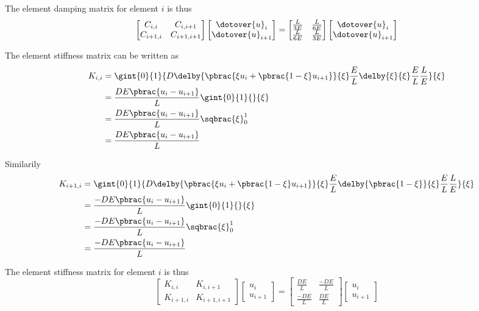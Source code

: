 The element damping matrix for element $i$ is thus
\begin{equation}
  \begin{bmatrix}
    C_{i,i} & C_{i,i+1} \\
    C_{i+1,i} & C_{i+1,i+1}
  \end{bmatrix}\begin{bmatrix}
    \dotover{u}_{i} \\
    \dotover{u}_{i+1}
  \end{bmatrix} = \begin{bmatrix}
    \frac{L}{3E} & \frac{L}{6E} \\
    \frac{L}{6E} & \frac{L}{3E}
   \end{bmatrix}\begin{bmatrix}
    \dotover{u}_{i} \\
    \dotover{u}_{i+1}
  \end{bmatrix}
\end{equation}


The element stiffness matrix can be written as
\begin{align}
  K_{i,i}&=\gint{0}{1}{D\delby{\pbrac{\xi u_{i}+\pbrac{1-\xi}u_{i+1}}}{\xi}\dfrac{E}{L}\delby{\xi}{\xi}\dfrac{E}{L}\dfrac{L}{E}}{\xi} \\
  &=\dfrac{DE\pbrac{u_{i}-u_{i+1}}}{L}\gint{0}{1}{}{\xi}\\
  &=\dfrac{DE\pbrac{u_{i}-u_{i+1}}}{L}\sqbrac{\xi}_{0}^{1}\\
  &=\dfrac{DE\pbrac{u_{i}-u_{i+1}}}{L}
\end{align}

Similarily
\begin{align}
  K_{i+1,i}&=\gint{0}{1}{D\delby{\pbrac{\xi u_{i}+\pbrac{1-\xi}u_{i+1}}}{\xi}\dfrac{E}{L}\delby{\pbrac{1-\xi}}{\xi}\dfrac{E}{L}\dfrac{L}{E}}{\xi} \\
  &=\dfrac{-DE\pbrac{u_{i}-u_{i+1}}}{L}\gint{0}{1}{}{\xi}\\
  &=\dfrac{-DE\pbrac{u_{i}-u_{i+1}}}{L}\sqbrac{\xi}_{0}^{1}\\
  &=\dfrac{-DE\pbrac{u_{i}-u_{i+1}}}{L}
\end{align}

The element stiffness matrix for element $i$ is thus
\begin{equation}
  \begin{bmatrix}
    K_{i,i} & K_{i,i+1} \\
    K_{i+1,i} & K_{i+1,i+1}
  \end{bmatrix}\begin{bmatrix}
    u_{i} \\
    u_{i+1}
  \end{bmatrix} = \begin{bmatrix}
    \frac{DE}{L} & \frac{-DE}{L} \\
    \frac{-DE}{L} & \frac{DE}{L}
   \end{bmatrix}\begin{bmatrix}
    u_{i} \\
    u_{i+1}
  \end{bmatrix}
\end{equation}

